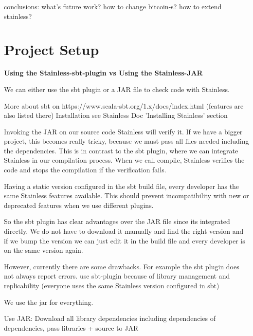 \documentclass[runningheads]{llncs}
\renewcommand{\paragraph}{\textbf}%
\newcommand{\todo}[1]{{\par \color{red}#1}}
\begin{document}
\todo{conclusions: what's future work? how to
  change bitcoin-s? how to extend stainless?}





\clearpage
\appendix

\section{Project Setup}

\paragraph{Using the Stainless-sbt-plugin vs Using the Stainless-JAR}

We can either use the sbt plugin or a JAR file to check code with Stainless.

More about sbt on https://www.scala-sbt.org/1.x/docs/index.html (features are also listed there)
Installation see Stainless Doc 'Installing Stainless' section


Invoking the JAR on our source code Stainless will verify it.  If we
have a bigger project, this becomes really tricky, because we must
pass all files needed including the dependencies.  This is in contrast
to the sbt plugin, where we can integrate Stainless in our compilation
process.  When we call compile, Stainless verifies the code and stops
the compilation if the verification fails.

Having a static version configured in the sbt build file, every
developer has the same Stainless features available.  This should
prevent incompatibility with new or deprecated features when we use
different plugins.

So the sbt plugin has clear advantages over the JAR file since its
integrated directly.  We do not have to download it manually and find
the right version and if we bump the version we can just edit it in
the build file and every developer is on the same version again.

However, currently there are some drawbacks.  For example the sbt
plugin does not always report errors.
use sbt-plugin because of library management and replicability (everyone uses the same Stainless version configured in sbt)


We use the jar for everything. 


Use JAR:
Download all library dependencies including dependencies of dependencies, pass libraries + source to JAR
  
\end{document}
